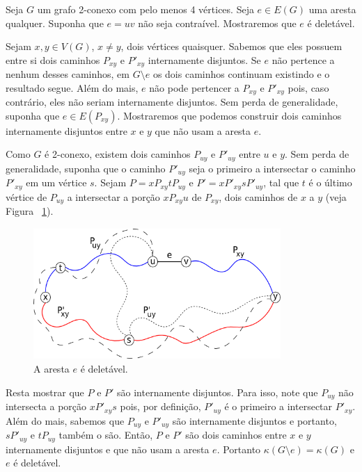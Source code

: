Seja $G$ um grafo 2-conexo com pelo menos 4 vértices. Seja $e \in E(G)$ uma
aresta qualquer. Suponha que $e = uv$ não seja contraível. Mostraremos que $e$
é deletável.

Sejam $x, y \in V(G)$, $x \ne y$, dois vértices quaisquer. Sabemos que eles
possuem entre si dois caminhos $P_{xy}$ e $P'_{xy}$ internamente disjuntos. Se
$e$ não pertence a nenhum desses caminhos, em $G \setminus e$ os dois caminhos
continuam existindo e o resultado segue. Além do mais, $e$ não pode pertencer a
$P_{xy}$ e $P'_{xy}$ pois, caso contrário, eles não seriam internamente
disjuntos. Sem perda de generalidade, suponha que $e \in E(P_{xy})$.
Mostraremos que podemos construir dois caminhos internamente disjuntos entre
$x$ e $y$ que não usam a aresta $e$.

Como $G$ é 2-conexo, existem dois caminhos $P_{uy}$ e $P'_{uy}$ entre $u$ e
$y$. Sem perda de generalidade, suponha que o caminho $P'_{uy}$ seja o primeiro
a intersectar o caminho $P'_{xy}$ em um vértice $s$. Sejam $P = xP_{xy}tP_{uy}$
e $P' = xP'_{xy}sP'_{uy}$, tal que $t$ é o último vértice de $P_{uy}$ a
intersectar a porção $xP_{xy}u$ de $P_{xy}$, dois caminhos de $x$ a $y$ (veja
Figura ~\ref{fig:grafoq916}).

\begin{figure}[htb]
    \centering
    \includegraphics[height=5cm, width=9.4cm]{figuras/graph_q916}
    \caption{A aresta $e$ é deletável.}
    \label{fig:grafoq916}
\end{figure}

Resta mostrar que $P$ e $P'$ são internamente disjuntos.  Para isso, note que
$P_{uy}$ não intersecta a porção $xP'_{xy}s$ pois, por definição, $P'_{uy}$ é o
primeiro a intersectar $P'_{xy}$. Além do mais, sabemos que $P_{uy}$ e
$P'_{uy}$ são internamente disjuntos e portanto, $sP'_{uy}$ e $tP_{uy}$ também
o são. Então, $P$ e $P'$ são dois caminhos entre $x$ e $y$ internamente
disjuntos e que não usam a aresta $e$. Portanto $\kappa(G \setminus e) =
\kappa(G)$ e $e$ é deletável.
\fimprova

